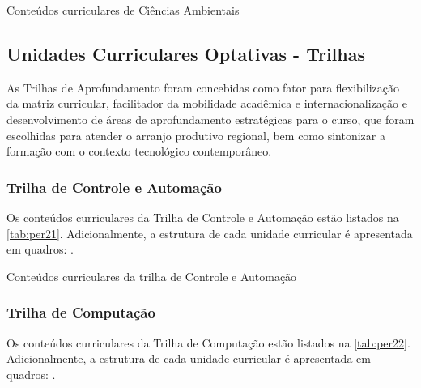 \begin{table}[!htb]
	\centering\footnotesize
	\caption{Conteúdos curriculares de Ciências Ambientais}
	\label{tab:per41}
\end{table}

\clearpage



\subsection{Unidades Curriculares Optativas - Trilhas}

As Trilhas de Aprofundamento foram concebidas como fator para flexibilização da matriz curricular, facilitador da mobilidade acadêmica e internacionalização e desenvolvimento de áreas de aprofundamento estratégicas para o curso, que foram escolhidas para atender o arranjo produtivo regional, bem como sintonizar a formação com o contexto tecnológico contemporâneo.

\subsubsection{Trilha de Controle e Automação}

Os conteúdos curriculares da Trilha de Controle e Automação estão listados na \autoref{tab:per21}. Adicionalmente, a estrutura de cada unidade curricular é apresentada em quadros: .

\begin{table}[!htb]
	\centering\footnotesize
	\caption{Conteúdos curriculares da trilha de Controle e Automação}
	\label{tab:per21}
\end{table}

\clearpage

\subsubsection{Trilha de Computação}

Os conteúdos curriculares da Trilha de Computação estão listados na \autoref{tab:per22}. Adicionalmente, a estrutura de cada unidade curricular é apresentada em quadros: .

